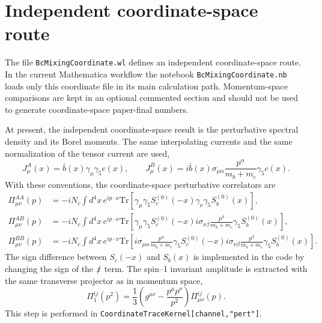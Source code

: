 \documentclass[11pt]{article}
\begin{document}
\section{Independent coordinate-space route}

The file \texttt{BcMixingCoordinate.wl} defines an independent
coordinate-space route.  In the current Mathematica workflow the notebook
\texttt{BcMixingCoordinate.nb} loads only this coordinate file in its main
calculation path.  Momentum-space comparisons are kept in an optional
commented section and should not be used to generate coordinate-space
paper-final numbers.

At present, the independent coordinate-space result is the perturbative
spectral density and its Borel moments.  The same interpolating currents and
the same normalization of the tensor current are used,
\begin{equation}
  J^A_\mu(x)=\bar b(x)\gamma_\mu\gamma_5c(x),
  \qquad
  J^B_\mu(x)=
  i\bar b(x)\sigma_{\mu\alpha}
  \frac{p^\alpha}{m_b+m_c}\gamma_5c(x).
\end{equation}
With these conventions, the coordinate-space perturbative correlators are
\begin{align}
  \Pi_{\mu\nu}^{AA}(p)
  &=
  -iN_c\int d^4x\,e^{ip\cdot x}
  \mathrm{Tr}\!\left[
    \gamma_\mu\gamma_5 S_c^{(0)}(-x)
    \gamma_\nu\gamma_5 S_b^{(0)}(x)
  \right],
  \\
  \Pi_{\mu\nu}^{AB}(p)
  &=
  -iN_c\int d^4x\,e^{ip\cdot x}
  \mathrm{Tr}\!\left[
    \gamma_\mu\gamma_5 S_c^{(0)}(-x)
    i\sigma_{\nu\beta}\frac{p^\beta}{m_b+m_c}\gamma_5
    S_b^{(0)}(x)
  \right],
  \\
  \Pi_{\mu\nu}^{BB}(p)
  &=
  -iN_c\int d^4x\,e^{ip\cdot x}
  \mathrm{Tr}\!\left[
    i\sigma_{\mu\alpha}\frac{p^\alpha}{m_b+m_c}\gamma_5
    S_c^{(0)}(-x)
    i\sigma_{\nu\beta}\frac{p^\beta}{m_b+m_c}\gamma_5
    S_b^{(0)}(x)
  \right].
\end{align}
The sign difference between \(S_c(-x)\) and \(S_b(x)\) is implemented in the
code by changing the sign of the \(\slashed{x}\) term.  The spin--1 invariant
amplitude is extracted with the same transverse projector as in momentum
space,
\begin{equation}
  \Pi_1^{ij}(p^2)
  =
  \frac{1}{3}
  \left(g^{\mu\nu}-\frac{p^\mu p^\nu}{p^2}\right)
  \Pi_{\mu\nu}^{ij}(p).
\end{equation}
This step is performed in \texttt{CoordinateTraceKernel[channel,"pert"]}.
\end{document}
